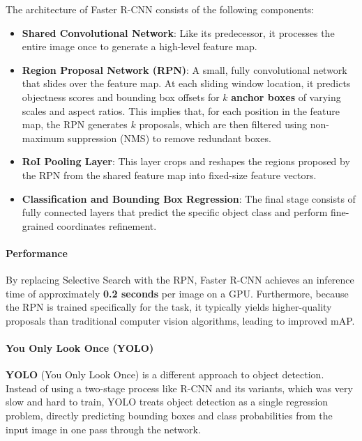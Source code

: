 The architecture of Faster R-CNN consists of the following components:
\begin{itemize}
    \item \textbf{Shared Convolutional Network}: Like its predecessor, it processes the entire image once to generate a high-level feature map.
    
    \item \textbf{Region Proposal Network (RPN)}: A small, fully convolutional network that slides over the feature map. 
    At each sliding window location, it predicts objectness scores and bounding box offsets for $k$ \textbf{anchor boxes} of varying scales and aspect ratios.
    This implies that, for each position in the feature map, the RPN generates $k$ proposals, which are then filtered using non-maximum suppression (NMS) to remove redundant boxes.
    
    \item \textbf{RoI Pooling Layer}: This layer crops and reshapes the regions proposed by the RPN from the shared feature map into fixed-size feature vectors.
    
    \item \textbf{Classification and Bounding Box Regression}: The final stage consists of fully connected layers that predict the specific object class and perform fine-grained coordinates refinement.
\end{itemize}

\paragraph{Performance}
By replacing Selective Search with the RPN, Faster R-CNN achieves an inference time of approximately \textbf{0.2 seconds} per image on a GPU. 
Furthermore, because the RPN is trained specifically for the task, it typically yields higher-quality proposals than traditional computer vision algorithms, leading to improved mAP.

\paragraph{You Only Look Once (YOLO)}
\textbf{YOLO} (You Only Look Once) is a different approach to object detection. Instead of using a two-stage process like R-CNN and its variants,
which was very slow and hard to train, YOLO treats object detection as a single regression problem, 
directly predicting bounding boxes and class probabilities from the input image in one pass through the network.

